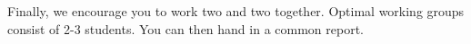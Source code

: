 \documentclass[%
oneside,                 %
final,                   %
10pt]{article}
\begin{document}
\noindent
Finally, 
we encourage you to work two and two together. Optimal working groups consist of 
2-3 students. You can then hand in a common report. 













\end{document}

